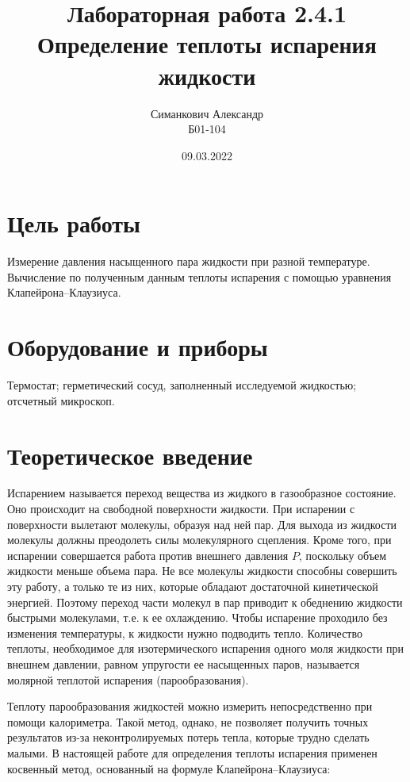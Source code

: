 \documentclass[12pt,a4paper]{article}
\title{Лабораторная работа 2.4.1\\ Определение теплоты испарения жидкости}
\author{Симанкович Александр \\ Б01-104}
\date{09.03.2022}
\begin{document}
	\maketitle
	
	\section*{Цель работы}
	
	Измерение давления насыщенного пара жидкости при разной температуре. \\
	Вычисление по полученным данным теплоты испарения с помощью уравнения Клапейрона–Клаузиуса.
	
	\section*{Оборудование и приборы} 
	Термостат; герметический сосуд, заполненный исследуемой жидкостью; отсчетный микроскоп.
	
	
	\section*{Теоретическое введение}
	
	Испарением называется переход вещества из жидкого в газообразное состояние. Оно происходит на свободной поверхности жидкости. При испарении с поверхности вылетают молекулы, образуя над ней пар. Для выхода из жидкости молекулы должны преодолеть силы молекулярного сцепления. Кроме того, при испарении совершается работа против внешнего давления $ P $, поскольку объем жидкости меньше объема пара. Не все молекулы жидкости способны совершить эту работу, а только те из них, которые обладают достаточной кинетической энергией. Поэтому переход части молекул в пар приводит к обеднению жидкости быстрыми молекулами, т.е. к ее охлаждению. Чтобы испарение проходило без изменения температуры, к жидкости нужно подводить тепло. Количество теплоты, необходимое для изотермического испарения одного моля жидкости при внешнем давлении, равном упругости ее насыщенных паров, называется молярной теплотой испарения (парообразования).
	
	Теплоту парообразования жидкостей можно измерить непосредственно при помощи калориметра. Такой метод, однако, не позволяет получить точных результатов из-за неконтролируемых потерь тепла, которые трудно сделать малыми. В настоящей работе для определения теплоты испарения применен косвенный метод, основанный на формуле Клапейрона–Клаузиуса:
	
\end{document}
